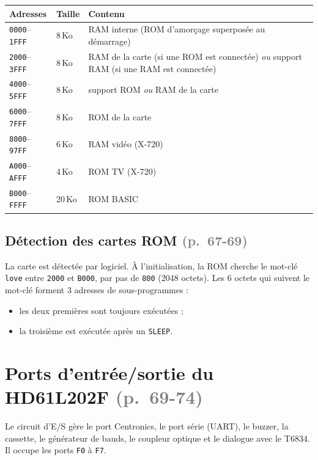 \documentclass[a4paper,10pt]{article}
\newcommand{\hex}[1]{\texttt{#1}}
\newcommand{\pg}[1]{\texorpdfstring{\textcolor{gray}{\small(p.~#1)}}{}}
\begin{document}
\begin{center}\small
\begin{tabular}{@{}lll@{}}
\toprule
Adresses & Taille & Contenu \\
\midrule
\hex{0000}--\hex{1FFF} & 8\,Ko & RAM interne (ROM d'amorçage superposée au démarrage) \\
\hex{2000}--\hex{3FFF} & 8\,Ko & RAM de la carte (si une ROM est connectée) \emph{ou} support RAM (si une RAM est connectée) \\
\hex{4000}--\hex{5FFF} & 8\,Ko & support ROM \emph{ou} RAM de la carte \\
\hex{6000}--\hex{7FFF} & 8\,Ko & ROM de la carte \\
\hex{8000}--\hex{97FF} & 6\,Ko & RAM vidéo (X-720) \\
\hex{A000}--\hex{AFFF} & 4\,Ko & ROM TV (X-720) \\
\hex{B000}--\hex{FFFF} & 20\,Ko & ROM BASIC \\
\bottomrule
\end{tabular}
\end{center}

\subsection{Détection des cartes ROM \pg{67-69}}
La carte est détectée par logiciel. À l'initialisation, la ROM cherche le
mot-clé \texttt{love} entre \hex{2000} et \hex{B000}, par pas de \hex{800}
(2048 octets). Les 6 octets qui suivent le mot-clé forment 3 adresses de
sous-programmes :
\begin{itemize}
  \item les deux premières sont toujours exécutées ;
  \item la troisième est exécutée après un \texttt{SLEEP}.
\end{itemize}

\section{Ports d'entrée/sortie du HD61L202F \pg{69-74}}\label{sec:ports}

Le circuit d'E/S gère le port Centronics, le port série (UART), le buzzer,
la cassette, le générateur de bauds, le coupleur optique et le dialogue avec
le T6834. Il occupe les ports \hex{F0} à \hex{F7}.
\end{document}
